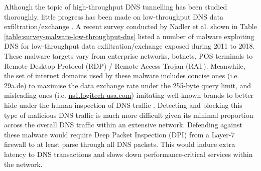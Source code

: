 \documentclass[a4paper]{report}
\begin{document}
\begin{table}[h]
\caption{A survery of malware from 2011-2018 exploiting DNS for low-throughput data exfiltration and exchange \cite{nadler-201936}}
\label{table:survey-malware-low-throughput-dns}
\end{table}

Although the topic of high-throughput DNS tunnelling has been studied thoroughly, little progress has been made on low-throughput DNS data exfiltration/exchange \cite{nadler-201936, steadman-2018, ahmed-2020}. A recent survey conducted by Nadler et al. \cite{nadler-201936} shown in Table \ref{table:survey-malware-low-throughput-dns} listed a number of malware exploiting DNS for low-throughput data exfiltration/exchange exposed during 2011 to 2018. These malware targets vary from enterprise networks, botnets, POS terminals to Remote Desktop Protocol (RDP) / Remote Access Trojan (RAT). Meanwhile, the set of internet domains used by these malware includes concise ones (i.e. \url{29a.de}) to maximise the data exchange rate under the 255-byte query limit, and misleading ones (i.e. \url{ns1.logitech-usa.com}) imitating well-known brands to better hide under the human inspection of DNS traffic \cite{nadler-201936}. Detecting and blocking this type of malicious DNS traffic is much more difficult given its minimal proportion across the overall DNS traffic within an extensive network. Defending against these malware would require Deep Packet Inspection (DPI) from a Layer-7 firewall to at least parse through all DNS packets. This would induce extra latency to DNS transactions and slows down performance-critical services within the network. 
\end{document}
